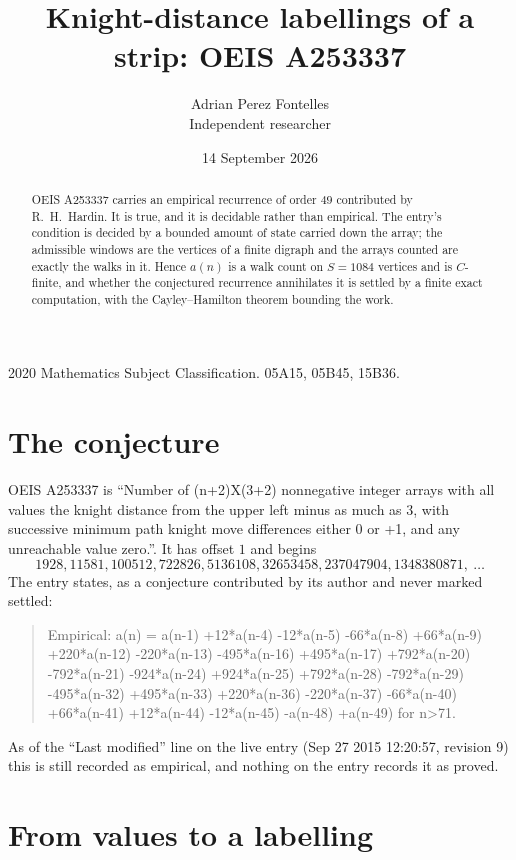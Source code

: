 \documentclass[11pt,a4paper]{article}
\title{Knight-distance labellings of a strip: OEIS A253337}
\author{Adrian Perez Fontelles\\ \small Independent researcher}
\date{14 September 2026}
\theoremstyle{plain}
\theoremstyle{definition}
\begin{document}
\maketitle

\begin{abstract}
OEIS A253337 carries an empirical recurrence of order $49$ contributed by R.~H.~Hardin. It is
true, and it is decidable rather than empirical. The entry's condition is decided by a bounded amount of state carried down the array; the
admissible windows are the vertices of a finite digraph and the arrays counted are exactly the
walks in it. Hence $a(n)$ is a walk count on $S=1084$ vertices and is $C$-finite, and whether the
conjectured recurrence annihilates it is settled by a finite exact computation, with the
Cayley--Hamilton theorem bounding the work.
\end{abstract}

\noindent\small 2020 Mathematics Subject Classification. 05A15, 05B45, 15B36.\normalsize

\section{The conjecture}

OEIS A253337 is ``Number of (n+2)X(3+2) nonnegative integer arrays with all values the knight distance from the upper left minus as much as 3, with successive minimum path knight move differences either 0 or +1, and any unreachable value zero.''. It has offset $1$ and begins
\[
1928, 11581, 100512, 722826, 5136108, 32653458, 237047904, 1348380871,\ \dots
\]
The entry states, as a conjecture contributed by its author and never marked settled:
\begin{quote}
Empirical: a(n) = a(n-1) +12*a(n-4) -12*a(n-5) -66*a(n-8) +66*a(n-9) +220*a(n-12) -220*a(n-13) -495*a(n-16) +495*a(n-17) +792*a(n-20) -792*a(n-21) -924*a(n-24) +924*a(n-25) +792*a(n-28) -792*a(n-29) -495*a(n-32) +495*a(n-33) +220*a(n-36) -220*a(n-37) -66*a(n-40) +66*a(n-41) +12*a(n-44) -12*a(n-45) -a(n-48) +a(n-49) for n>71.
\end{quote}
As of the ``Last modified'' line on the live entry (Sep 27 2015 12:20:57, revision 9) this is still
recorded as empirical, and nothing on the entry records it as proved.

\section{From values to a labelling}
\end{document}
